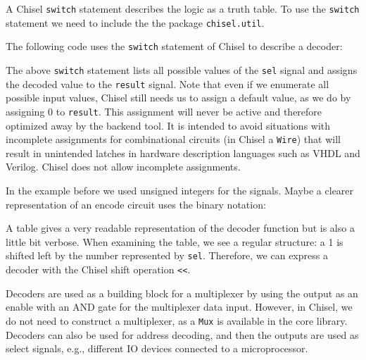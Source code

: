 \documentclass[%
    10pt,
    headinclude, footexclude,
    openright, %
    notitlepage,
    cleardoubleempty,
    headsepline,
    pointlessnumbers,
    bibtotoc, idxtotoc,
    ]{scrbook}
\newcommand{\code}[1]{{\small{\texttt{#1}}}}
\newcommand{\todo}[1]{{\emph{TODO: #1}}}
\renewcommand{\todo}[1]{}
\begin{document}
A Chisel \code{switch} statement describes the logic as a truth table.
To use the \code{switch} statement we need to include the the package \code{chisel.util}.


\noindent The following code uses the \code{switch} statement of Chisel to describe a decoder:



\noindent The above \code{switch} statement lists all possible values of the \code{sel} signal
and assigns the decoded value to the \code{result} signal.
Note that even if we enumerate all possible input values, Chisel still needs us to assign a
default value, as we do by assigning 0 to \code{result}.
This assignment will never be active and therefore optimized away by the backend tool.
It is intended to avoid situations with incomplete assignments for combinational circuits
(in Chisel a \code{Wire}) that will result in unintended latches in hardware description
languages such as VHDL and Verilog. Chisel does not allow incomplete assignments.

In the example before we used unsigned integers for the signals. Maybe a clearer representation
of an encode circuit uses the binary notation:


\todo{from Luca: for very small examples. What if the one-hot input is 256 wires? Can Chisel capture that? Or I need 256 lines? I would suggest to put an additional example. Maybe there is something like the for loop in VHDL.}

A table gives a very readable representation of the decoder function but is also
a little bit verbose.
When examining the table, we see a regular structure: a 1 is shifted left by the number
represented by \code{sel}. Therefore, we can express a decoder with the Chisel shift
operation \code{<<}.


Decoders are used as a building block for a multiplexer by using the output as an enable
with an AND gate for the multiplexer data input. However, in Chisel, we do not need to construct
a multiplexer, as a \code{Mux} is available in the core library.
Decoders can also be used for address decoding, and then the outputs are used as
select signals, e.g., different IO devices connected to a microprocessor. 
\end{document}
